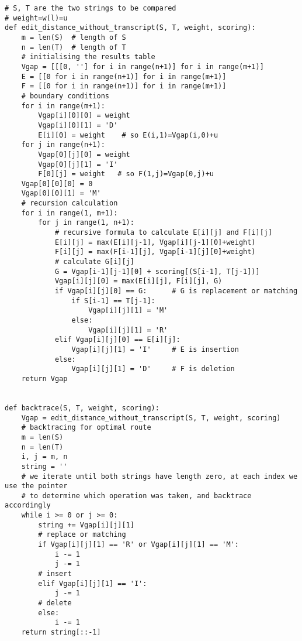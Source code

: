 \lstset{basicstyle=\footnotesize,style=myCustomMatlabStyle}
\begin{lstlisting}
# S, T are the two strings to be compared
# weight=w(l)=u
def edit_distance_without_transcript(S, T, weight, scoring):
    m = len(S)  # length of S
    n = len(T)  # length of T
    # initialising the results table
    Vgap = [[[0, ''] for i in range(n+1)] for i in range(m+1)]
    E = [[0 for i in range(n+1)] for i in range(m+1)]
    F = [[0 for i in range(n+1)] for i in range(m+1)]
    # boundary conditions
    for i in range(m+1):
        Vgap[i][0][0] = weight
        Vgap[i][0][1] = 'D'
        E[i][0] = weight    # so E(i,1)=Vgap(i,0)+u
    for j in range(n+1):
        Vgap[0][j][0] = weight
        Vgap[0][j][1] = 'I'
        F[0][j] = weight   # so F(1,j)=Vgap(0,j)+u
    Vgap[0][0][0] = 0
    Vgap[0][0][1] = 'M'
    # recursion calculation
    for i in range(1, m+1):
        for j in range(1, n+1):
            # recursive formula to calculate E[i][j] and F[i][j]
            E[i][j] = max(E[i][j-1], Vgap[i][j-1][0]+weight)
            F[i][j] = max(F[i-1][j], Vgap[i-1][j][0]+weight)
            # calculate G[i][j]
            G = Vgap[i-1][j-1][0] + scoring[(S[i-1], T[j-1])]
            Vgap[i][j][0] = max(E[i][j], F[i][j], G)
            if Vgap[i][j][0] == G:      # G is replacement or matching
                if S[i-1] == T[j-1]:
                    Vgap[i][j][1] = 'M'
                else:
                    Vgap[i][j][1] = 'R'
            elif Vgap[i][j][0] == E[i][j]:
                Vgap[i][j][1] = 'I'     # E is insertion
            else:
                Vgap[i][j][1] = 'D'     # F is deletion
    return Vgap


def backtrace(S, T, weight, scoring):
    Vgap = edit_distance_without_transcript(S, T, weight, scoring)
    # backtracing for optimal route
    m = len(S)
    n = len(T)
    i, j = m, n
    string = ''
    # we iterate until both strings have length zero, at each index we use the pointer
    # to determine which operation was taken, and backtrace accordingly
    while i >= 0 or j >= 0:
        string += Vgap[i][j][1]
        # replace or matching
        if Vgap[i][j][1] == 'R' or Vgap[i][j][1] == 'M':
            i -= 1
            j -= 1
        # insert
        elif Vgap[i][j][1] == 'I':
            j -= 1
        # delete
        else:
            i -= 1
    return string[::-1]
\end{lstlisting}